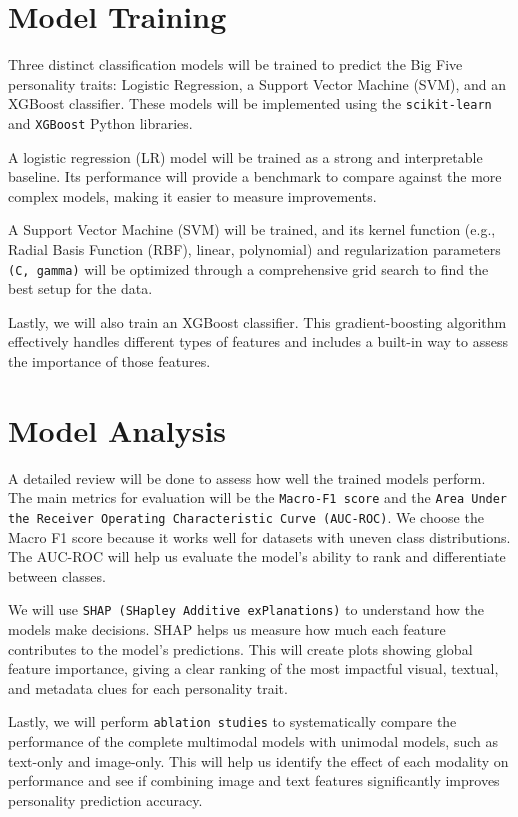 \section{Model Training}
\label{subsec:models}

Three distinct classification models will be trained to predict the Big Five personality traits: Logistic Regression, a Support Vector Machine (SVM), and an XGBoost classifier. These models will be implemented using the \texttt{scikit-learn} \citep{pedregosa2011} and \texttt{XGBoost} \citep{chen2016} Python libraries.

A logistic regression (LR) model will be trained as a strong and interpretable baseline. Its performance will provide a benchmark to compare against the more complex models, making it easier to measure improvements.

A Support Vector Machine (SVM) will be trained, and its kernel function (e.g., Radial Basis Function (RBF), linear, polynomial) and regularization parameters \texttt{(C, gamma)} will be optimized through a comprehensive grid search to find the best setup for the data.

Lastly, we will also train an XGBoost classifier. This gradient-boosting algorithm effectively handles different types of features and includes a built-in way to assess the importance of those features.

\section{Model Analysis}
\label{subsec:analysis}
A detailed review will be done to assess how well the trained models perform. The main metrics for evaluation will be the \texttt{Macro-F1 score} and the \texttt{Area Under the Receiver Operating Characteristic Curve (AUC-ROC)}. We choose the Macro F1 score because it works well for datasets with uneven class distributions. The AUC-ROC will help us evaluate the model's ability to rank and differentiate between classes.

We will use \texttt{SHAP (SHapley Additive exPlanations)} to understand how the models make decisions. SHAP helps us measure how much each feature contributes to the model's predictions. This will create plots showing global feature importance, giving a clear ranking of the most impactful visual, textual, and metadata clues for each personality trait.

Lastly, we will perform \texttt{ablation studies} to systematically compare the performance of the complete multimodal models with unimodal models, such as text-only and image-only. This will help us identify the effect of each modality on performance and see if combining image and text features significantly improves personality prediction accuracy.